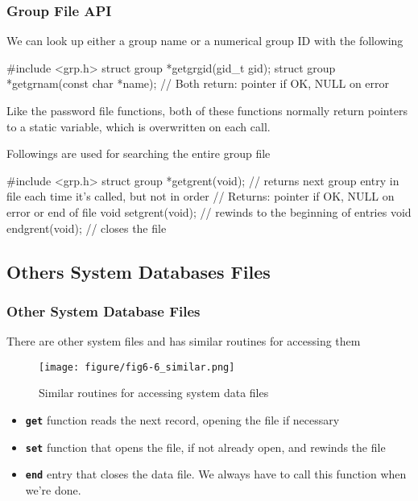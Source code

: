 \documentclass[newPxFont,sthlmFooter,nooffset]{beamer}
\begin{document}
\begin{frame}[containsverbatim,t]
  \frametitle{Group File API}

We can look up either a group name or a numerical group ID with the following

\begin{codedef}
#include <grp.h>
struct group *getgrgid(gid_t gid);
struct group *getgrnam(const char *name);
// Both return: pointer if OK, NULL on error
\end{codedef}

Like the password file functions, both of these functions normally return pointers to a static variable, which is overwritten on each call.

Followings are used for searching the entire group file
\begin{codedef}
#include <grp.h>
struct group *getgrent(void);  // returns next group entry in file each time it's called, but not in order
// Returns: pointer if OK, NULL on error or end of file
void setgrent(void);  // rewinds to the beginning of entries
void endgrent(void);  // closes the file
\end{codedef}


\end{frame}



\subsection{Others System Databases Files}

\begin{frame}[t]
  \frametitle{Other System Database Files}
There are other system files and has similar routines for accessing them


\begin{figure}[h]
  \centering
  \texttt{[image: figure/fig6-6\_similar.png]}
  \caption{Similar routines for accessing system data files}
\end{figure}


\begin{itemize}
\item \textbf{\texttt{get}} function reads the next record, opening the file if necessary
\item \textbf{\texttt{set}} function that opens the file, if not already open, and rewinds the file
\item \textbf{\texttt{end}} entry that closes the data file. We always have to call this function when we're done.
\end{itemize}

\end{frame}
\end{document}
